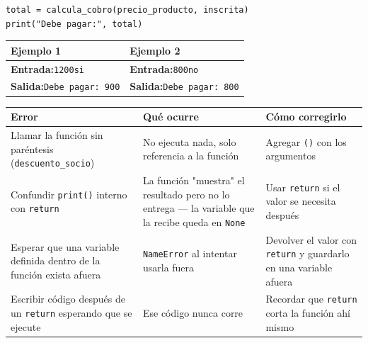 \documentclass[11pt]{article}
\begin{document}
\begin{estrategiabox}
\begin{cajacodigo}
\begin{Verbatim}[fontsize=\small]
total = calcula_cobro(precio_producto, inscrita)
print("Debe pagar:", total)
\end{Verbatim}
\end{cajacodigo}

\vspace{1mm}
\noindent\begin{tabularx}{\linewidth}{|X|X|}
\hline
\textbf{Ejemplo 1} & \textbf{Ejemplo 2} \\
\hline
\textbf{Entrada:}\newline \texttt{1200}\newline \texttt{si} & \textbf{Entrada:}\newline \texttt{800}\newline \texttt{no} \\
\hline
\textbf{Salida:}\newline \texttt{Debe pagar: 900} & \textbf{Salida:}\newline \texttt{Debe pagar: 800} \\
\hline
\end{tabularx}
\end{estrategiabox}

\begin{alertabox}
\noindent\begin{tabularx}{\linewidth}{|X|X|X|}
\hline
\textbf{Error} & \textbf{Qué ocurre} & \textbf{Cómo corregirlo} \\
\hline
Llamar la función sin paréntesis (\texttt{descuento\_socio}) & No ejecuta nada, solo referencia a la función & Agregar \texttt{()} con los argumentos \\
\hline
Confundir \texttt{print()} interno con \texttt{return} & La función "muestra" el resultado pero no lo entrega --- la variable que la recibe queda en \texttt{None} & Usar \texttt{return} si el valor se necesita después \\
\hline
Esperar que una variable definida dentro de la función exista afuera & \texttt{NameError} al intentar usarla fuera & Devolver el valor con \texttt{return} y guardarlo en una variable afuera \\
\hline
Escribir código después de un \texttt{return} esperando que se ejecute & Ese código nunca corre & Recordar que \texttt{return} corta la función ahí mismo \\
\hline
\end{tabularx}
\end{alertabox}
\end{document}
